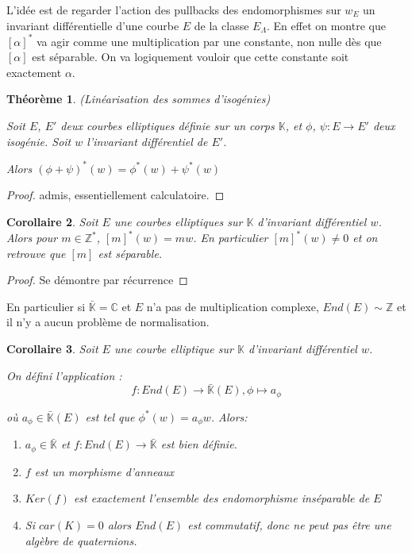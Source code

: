 \documentclass{article}
\newcommand{\Z}[0]{\mathbb{Z}}
\newcommand{\C}[0]{\mathbb{C}}
\newcommand{\K}[0]{\mathbb{K}}
\newcommand{\Kb}[0]{\bar{\K}}
\newtheorem{The}{Théorème}[section]
\newtheorem{Coro}[The]{Corollaire}
\begin{document}
L'idée est de regarder l'action des pullbacks des endomorphismes sur $w_E$ un invariant différentielle d'une courbe $E$ de la classe $E_\Lambda$. En effet on montre que $[\alpha]^{*}$ va agir comme une multiplication par une constante, non nulle dès que $[\alpha]$ est séparable. On va logiquement vouloir que cette constante soit exactement $\alpha$. 

\begin{The}
	(Linéarisation des sommes d'isogénies)
	
	Soit $E$, $E'$ deux courbes elliptiques définie sur un corps $\K$, et $\phi$, $\psi : E \rightarrow E'$ deux isogénie. Soit $w$ l'invariant différentiel de $E'$.
	
	Alors $\left( \phi + \psi\right) ^{*}\left( w\right) = \phi^{*}\left( w\right) + \psi^{*}\left( w\right)$
\end{The}

\begin{proof}
	admis, essentiellement calculatoire.
\end{proof}

\begin{Coro}
	Soit $E$ une courbes elliptiques sur $\K$ d'invariant différentiel $w$. Alors pour $m\in\Z^{*}$,
	$[m]^{*}(w) = mw$. En particulier $[m]^{*}(w) \neq 0 $ et on retrouve que $[m]$ est séparable.
\end{Coro}

\begin{proof}
	Se démontre par récurrence
\end{proof}

En particulier si $\Kb = \C$ et $E$ n'a pas de multiplication complexe, $End(E)\sim\Z$ et il n'y a aucun problème de normalisation. 

\begin{Coro}
	Soit $E$ une courbe elliptique sur $\K$ d'invariant différentiel $w$. 
	
	On défini l'application :
	\begin{equation*}
		f : End(E)\rightarrow\Kb(E) , \phi\longmapsto a_{\phi}
	\end{equation*}
	
	où $a_{\phi}\in\Kb(E)$ est tel que $\phi^{*}(w) = a_{\phi}w$. Alors:
	
	\begin{enumerate}
		\item $a_{\phi}\in\Kb$ et $f: End(E)\rightarrow\Kb$ est bien définie. 
		\item $f$ est un morphisme d'anneaux
		\item $Ker(f)$ est exactement l'ensemble des endomorphisme inséparable de $E$
		\item Si $car(K) = 0$ alors $End(E)$ est commutatif, donc ne peut pas être une algèbre de quaternions.
	\end{enumerate}
	
\end{Coro}
\end{document}
